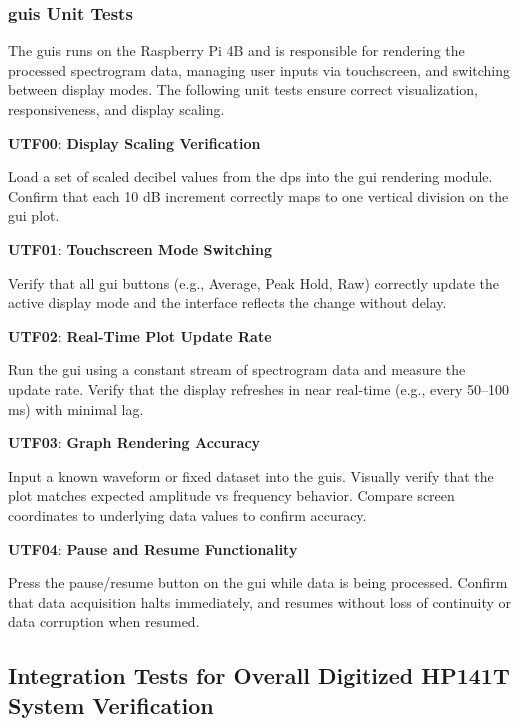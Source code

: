 \documentclass[class=report,11pt,crop=false]{standalone}
\begin{document}
	\subsubsection{\acrshort{guis} Unit Tests}
	The \acrshort{guis} runs on the Raspberry Pi 4B and is responsible for rendering the processed spectrogram data, managing user inputs via touchscreen, and switching between display modes. The following unit tests ensure correct visualization, responsiveness, and display scaling.
	
	\begin{center}
		\textbf{UTF00}: \textbf{Display Scaling Verification}
	\end{center}
	Load a set of scaled decibel values from the \acrshort{dps} into the \acrshort{gui} rendering module. Confirm that each 10 dB increment correctly maps to one vertical division on the \acrshort{gui} plot.
	
	\begin{center}
		\textbf{UTF01}: \textbf{Touchscreen Mode Switching}
	\end{center}
	Verify that all \acrshort{gui} buttons (e.g., Average, Peak Hold, Raw) correctly update the active display mode and the interface reflects the change without delay.
	
	\begin{center}
		\textbf{UTF02}: \textbf{Real-Time Plot Update Rate}
	\end{center}
	Run the \acrshort{gui} using a constant stream of spectrogram data and measure the update rate. Verify that the display refreshes in near real-time (e.g., every 50–100 ms) with minimal lag.
	
	\begin{center}
		\textbf{UTF03}: \textbf{Graph Rendering Accuracy}
	\end{center}
	Input a known waveform or fixed dataset into the \acrshort{guis}. Visually verify that the plot matches expected amplitude vs frequency behavior. Compare screen coordinates to underlying data values to confirm accuracy.
	
	\begin{center}
		\textbf{UTF04}: \textbf{Pause and Resume Functionality}
	\end{center}
	Press the pause/resume button on the \acrshort{gui} while data is being processed. Confirm that data acquisition halts immediately, and resumes without loss of continuity or data corruption when resumed.
	
	\subsection{Integration Tests for Overall Digitized HP141T System Verification}
	
\end{document}
